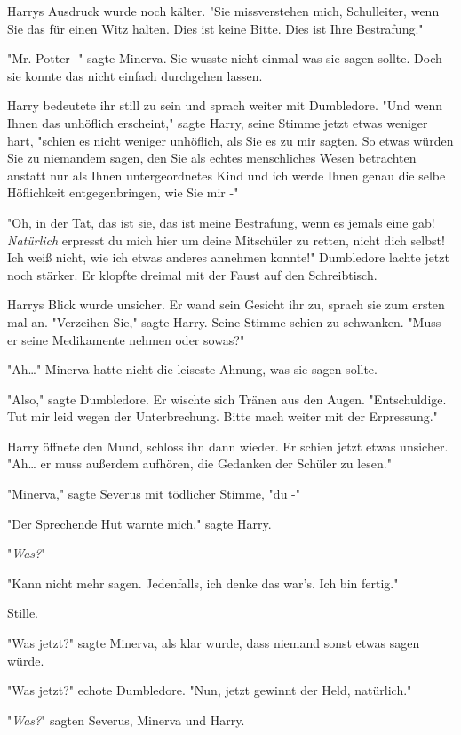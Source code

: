 {Harrys Ausdruck wurde noch kälter. "Sie missverstehen mich, Schulleiter, wenn Sie das für einen Witz halten. Dies ist keine Bitte. Dies ist Ihre Bestrafung."

"Mr. Potter -" sagte Minerva. Sie wusste nicht einmal was sie sagen sollte. Doch sie konnte das nicht einfach durchgehen lassen.

Harry bedeutete ihr still zu sein und sprach weiter mit Dumbledore. "Und wenn Ihnen das unhöflich erscheint," sagte Harry, seine Stimme jetzt etwas weniger hart, "schien es nicht weniger unhöflich, als Sie es zu mir sagten. So etwas würden Sie zu niemandem sagen, den Sie als echtes menschliches Wesen betrachten anstatt nur als Ihnen untergeordnetes Kind und ich werde Ihnen genau die selbe Höflichkeit entgegenbringen, wie Sie mir -"

"Oh, in der Tat, das ist sie, das ist meine Bestrafung, wenn es jemals eine gab! \emph{Natürlich} erpresst du mich hier um deine Mitschüler zu retten, nicht dich selbst! Ich weiß nicht, wie ich etwas anderes annehmen konnte!" Dumbledore lachte jetzt noch stärker. Er klopfte dreimal mit der Faust auf den Schreibtisch.

Harrys Blick wurde unsicher. Er wand sein Gesicht ihr zu, sprach sie zum ersten mal an. "Verzeihen Sie," sagte Harry. Seine Stimme schien zu schwanken. "Muss er seine Medikamente nehmen oder sowas?"

"Ah…" Minerva hatte nicht die leiseste Ahnung, was sie sagen sollte.

"Also," sagte Dumbledore. Er wischte sich Tränen aus den Augen. "Entschuldige. Tut mir leid wegen der Unterbrechung. Bitte mach weiter mit der Erpressung."

Harry öffnete den Mund, schloss ihn dann wieder. Er schien jetzt etwas unsicher. "Ah… er muss außerdem aufhören, die Gedanken der Schüler zu lesen."

"Minerva," sagte Severus mit tödlicher Stimme, "du -"

"Der Sprechende Hut warnte mich," sagte Harry.

"\emph{Was?}"

"Kann nicht mehr sagen. Jedenfalls, ich denke das war's. Ich bin fertig."

Stille.

"Was jetzt?" sagte Minerva, als klar wurde, dass niemand sonst etwas sagen würde.

"Was jetzt?" echote Dumbledore. "Nun, jetzt gewinnt der Held, natürlich."

"\emph{Was?}" sagten Severus, Minerva und Harry.

}
